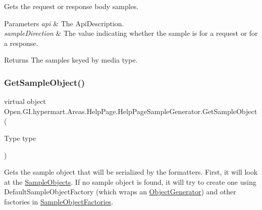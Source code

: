 Gets the request or response body samples. 


\begin{DoxyParams}{Parameters}
{\em api} & The Api\+Description.\\
\hline
{\em sample\+Direction} & The value indicating whether the sample is for a request or for a response.\\
\hline
\end{DoxyParams}
\begin{DoxyReturn}{Returns}
The samples keyed by media type.
\end{DoxyReturn}
\hypertarget{class_open_1_1_g_i_1_1hypermart_1_1_areas_1_1_help_page_1_1_help_page_sample_generator_ae69a2233e30b8e1799fe175bc0e65821}{}\label{class_open_1_1_g_i_1_1hypermart_1_1_areas_1_1_help_page_1_1_help_page_sample_generator_ae69a2233e30b8e1799fe175bc0e65821} 
\subsubsection{\texorpdfstring{Get\+Sample\+Object()}{GetSampleObject()}}
{\footnotesize\ttfamily virtual object Open.\+G\+I.\+hypermart.\+Areas.\+Help\+Page.\+Help\+Page\+Sample\+Generator.\+Get\+Sample\+Object (\begin{DoxyParamCaption}\item[{Type}]{type }\end{DoxyParamCaption})\hspace{0.3cm}{\ttfamily [virtual]}}



Gets the sample object that will be serialized by the formatters. First, it will look at the \hyperlink{class_open_1_1_g_i_1_1hypermart_1_1_areas_1_1_help_page_1_1_help_page_sample_generator_a1a16afd9020493bb00d793ed79d0a056}{Sample\+Objects}. If no sample object is found, it will try to create one using Default\+Sample\+Object\+Factory (which wraps an \hyperlink{class_open_1_1_g_i_1_1hypermart_1_1_areas_1_1_help_page_1_1_object_generator}{Object\+Generator}) and other factories in \hyperlink{class_open_1_1_g_i_1_1hypermart_1_1_areas_1_1_help_page_1_1_help_page_sample_generator_a659aa13a69376385d931264d06fbd398}{Sample\+Object\+Factories}. 


